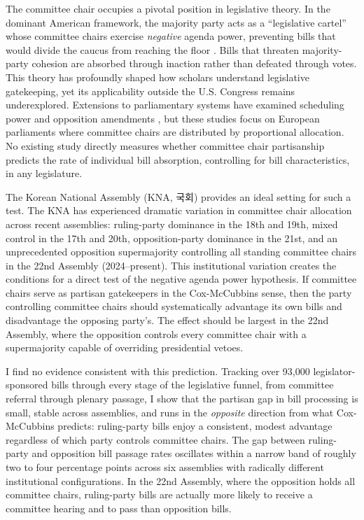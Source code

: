 \documentclass[11pt]{article}
\begin{document}
The committee chair occupies a pivotal position in legislative theory. In the dominant American framework, the majority party acts as a ``legislative cartel'' whose committee chairs exercise \textit{negative} agenda power, preventing bills that would divide the caucus from reaching the floor \citep{cox2005}. Bills that threaten majority-party cohesion are absorbed through inaction rather than defeated through votes. This theory has profoundly shaped how scholars understand legislative gatekeeping, yet its applicability outside the U.S. Congress remains underexplored. Extensions to parliamentary systems have examined scheduling power \citep{fortunato2017} and opposition amendments \citep{konig2022}, but these studies focus on European parliaments where committee chairs are distributed by proportional allocation. No existing study directly measures whether committee chair partisanship predicts the rate of individual bill absorption, controlling for bill characteristics, in any legislature.

The Korean National Assembly (KNA, 국회) provides an ideal setting for such a test. The KNA has experienced dramatic variation in committee chair allocation across recent assemblies: ruling-party dominance in the 18th and 19th, mixed control in the 17th and 20th, opposition-party dominance in the 21st, and an unprecedented opposition supermajority controlling all standing committee chairs in the 22nd Assembly (2024--present). This institutional variation creates the conditions for a direct test of the negative agenda power hypothesis. If committee chairs serve as partisan gatekeepers in the Cox-McCubbins sense, then the party controlling committee chairs should systematically advantage its own bills and disadvantage the opposing party's. The effect should be largest in the 22nd Assembly, where the opposition controls every committee chair with a supermajority capable of overriding presidential vetoes.

I find no evidence consistent with this prediction. Tracking over 93,000 legislator-sponsored bills through every stage of the legislative funnel, from committee referral through plenary passage, I show that the partisan gap in bill processing is small, stable across assemblies, and runs in the \textit{opposite} direction from what Cox-McCubbins predicts: ruling-party bills enjoy a consistent, modest advantage regardless of which party controls committee chairs. The gap between ruling-party and opposition bill passage rates oscillates within a narrow band of roughly two to four percentage points across six assemblies with radically different institutional configurations. In the 22nd Assembly, where the opposition holds all committee chairs, ruling-party bills are actually more likely to receive a committee hearing and to pass than opposition bills.
\end{document}
